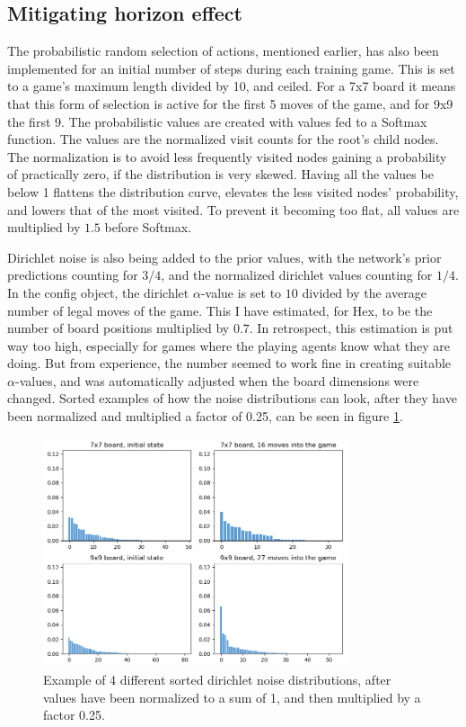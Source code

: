 \subsection{Mitigating horizon effect}
The probabilistic random selection of actions, mentioned earlier, has also been implemented for an initial number of steps during each training game. This is set to a game's maximum length divided by 10, and ceiled. For a 7x7 board it means that this form of selection is active for the first 5 moves of the game, and for 9x9 the first 9. The probabilistic values are created with values fed to a Softmax function. The values are the normalized visit counts for the root's child nodes. The normalization is to avoid less frequently visited nodes gaining a probability of practically zero, if the distribution is very skewed. Having all the values be below 1 flattens the distribution curve, elevates the less visited nodes' probability, and lowers that of the most visited. To prevent it becoming too flat, all values are multiplied by $1.5$ before Softmax. 

Dirichlet noise is also being added to the prior values, with the network's prior predictions counting for $3/4$, and the normalized dirichlet values counting for $1/4$. In the config object, the dirichlet $\alpha$-value is set to $10$ divided by the average number of legal moves of the game. This I have estimated, for Hex, to be the number of board positions multiplied by $0.7$. In retrospect, this estimation is put way too high, especially for games where the playing agents know what they are doing. But from experience, the number seemed to work fine in creating suitable $\alpha$-values, and was automatically adjusted when the board dimensions were changed. Sorted examples of how the noise distributions can look, after they have been normalized and multiplied a factor of 0.25, can be seen in figure \ref{fig-dir-dist}.

\begin{figure}[ht]
	\centering
	\includegraphics[width=0.8\textwidth]{figures/dirichlet-dist}
	\caption{Example of 4 different sorted dirichlet noise distributions, after values have been normalized to a sum of 1, and then multiplied by a factor 0.25.}
	\label{fig-dir-dist}
\end{figure}

